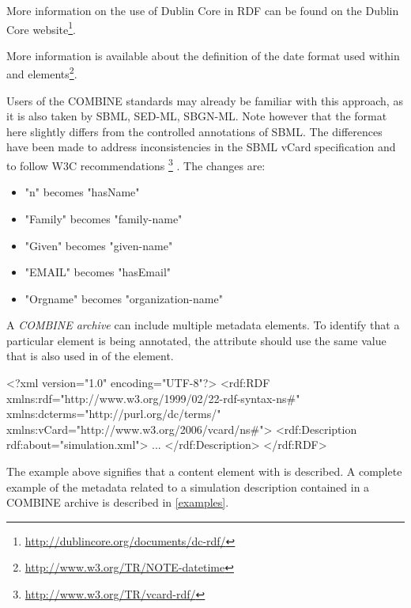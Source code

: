 \begin{itemize}
{	More information on the use of Dublin Core in RDF can be found 
	on the Dublin Core website{\footnote[3]{\url{http://dublincore.org/documents/dc-rdf/}}}. } 
	
	More information is available about the definition of the date format used within  and 
	 elements{\footnote[4]{\url{http://www.w3.org/TR/NOTE-datetime}}}.

\end{itemize}

Users of the COMBINE standards may already be familiar with this 
approach, as it is also taken by SBML, SED-ML, SBGN-ML. 
Note however that the format here slightly differs from the controlled 
annotations of SBML. The differences have been made to address inconsistencies 
in the SBML vCard specification and to follow W3C recommendations {\footnote[4]{\url{http://www.w3.org/TR/vcard-rdf/}}} . The changes 
are:

\begin{itemize}
	\item  "n" becomes "hasName" 
	\item  "Family" becomes "family-name" 
	\item  "Given" becomes "given-name" 
	\item  "EMAIL" becomes "hasEmail" 
	\item  "Orgname" becomes "organization-name" 
\end{itemize}

A \textit{COMBINE archive} can include multiple metadata elements. To 
identify that a particular \Content element is being annotated, the 
 attribute should use the same value that is also used 
in  of the \Content element. 


\begin{example}
<?xml version="1.0" encoding="UTF-8"?>
<rdf:RDF xmlns:rdf="http://www.w3.org/1999/02/22-rdf-syntax-ns#" 
         xmlns:dcterms="http://purl.org/dc/terms/" 
				 xmlns:vCard="http://www.w3.org/2006/vcard/ns#">
   <rdf:Description rdf:about="simulation.xml">
   ...
	 </rdf:Description>
</rdf:RDF>
\end{example}

The example above signifies that a content element with 
 is described. A complete example of 
the metadata related to a simulation description contained in a COMBINE 
archive is described in \ref{examples}. 


